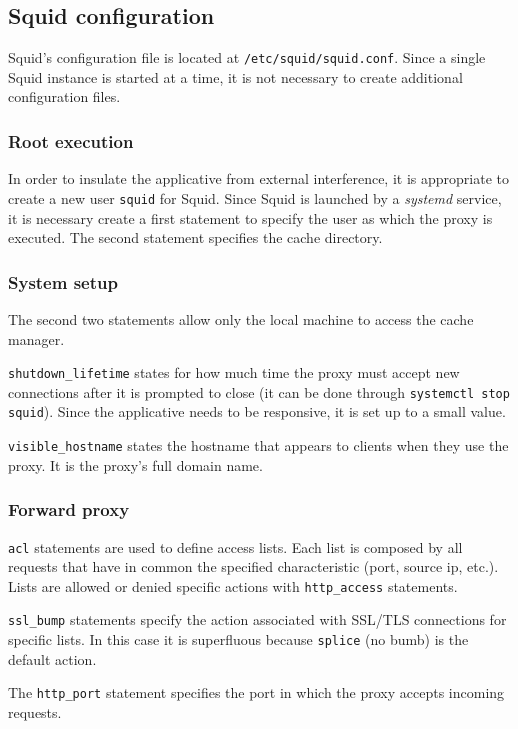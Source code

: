\documentclass{homework}
\newcommand{\sq}{Squid\xspace}
\begin{document}
    \subsection{Squid configuration}
    \sq's configuration file is located at \texttt{/etc/squid/squid.conf}.
    Since a single \sq instance is started at a time, it is not necessary to create additional configuration files.
    
    \subsubsection{Root execution}
    In order to insulate the applicative from external interference, it is appropriate to create a new user \texttt{squid} for \sq.
    Since \sq is launched by a \textit{systemd} service, it is necessary create a first statement to specify the user as which the proxy is executed.
    The second statement specifies the cache directory.
    
    \subsubsection{System setup}
    The second two statements allow only the local machine to access the cache manager.
    
    \texttt{shutdown\_lifetime} states for how much time the proxy must accept new connections after it is prompted to close (it can be done through \texttt{systemctl stop squid}).
    Since the applicative needs to be responsive, it is set up to a small value.
    
    \texttt{visible\_hostname} states the hostname that appears to clients when they use the proxy.
    It is the proxy's full domain name.
    
    \subsubsection{Forward proxy}
    \texttt{acl} statements are used to define access lists.
    Each list is composed by all requests that have in common the specified characteristic (port, source ip, etc.).
    Lists are allowed or denied specific actions with \texttt{http\_access} statements.
    
    \texttt{ssl\_bump} statements specify the action associated with SSL/TLS connections for specific lists.
    In this case it is superfluous because \texttt{splice} (no bumb) is the default action.
    
    The \texttt{http\_port} statement specifies the port in which the proxy accepts incoming requests.
    
\end{document}

